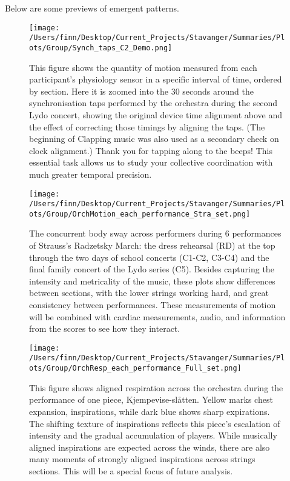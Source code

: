  Below are some previews of emergent patterns.
\ %
	\SepRule
\begin{figure}[h]
\begin{center}
\texttt{[image: /Users/finn/Desktop/Current\_Projects/Stavanger/Summaries/Plots/Group/Synch\_taps\_C2\_Demo.png]}
\caption{This figure shows the quantity of motion measured from each participant's physiology sensor in a specific interval of time, ordered by section. Here it is zoomed into the 30 seconds around the synchronisation taps performed by the orchestra during the second Lydo concert, showing the original device time alignment above and the effect of correcting those timings by aligning the taps. (The beginning of Clapping music was also used as a secondary check on clock alignment.) Thank you for tapping along to the beeps! This essential task allows us to study your collective coordination with much greater temporal precision.}
\label{Synch}
\end{center}
\end{figure}
\begin{figure}[h]
\begin{center}
\texttt{[image: /Users/finn/Desktop/Current\_Projects/Stavanger/Summaries/Plots/Group/OrchMotion\_each\_performance\_Stra\_set.png]}
\caption{The concurrent body sway across performers during 6 performances of Strauss's Radzetsky March: the dress rehearsal (RD) at the top through the two days of school concerts (C1-C2, C3-C4) and the final family concert of the Lydo series (C5).  Besides capturing the intensity and metricality of the music, these plots show differences between sections, with the lower strings working hard, and great consistency between performances. These measurements of motion will be combined with cardiac measurements, audio, and information from the scores to see how they interact.}
\label{QoM}
\end{center}
\end{figure}
\begin{figure}[h]
\begin{center}
\texttt{[image: /Users/finn/Desktop/Current\_Projects/Stavanger/Summaries/Plots/Group/OrchResp\_each\_performance\_Full\_set.png]}
\caption{This figure shows aligned respiration across the orchestra during the performance of one piece, Kjempevise-slåtten.  Yellow marks chest expansion, inspirations, while dark blue shows sharp expirations. The shifting texture of inspirations reflects this piece's escalation of intensity and the gradual accumulation of players. While musically aligned inspirations are expected across the winds, there are also many moments of strongly aligned inspirations across strings sections. This will be a special focus of future analysis.}
\label{Resp}
\end{center}
\end{figure}
